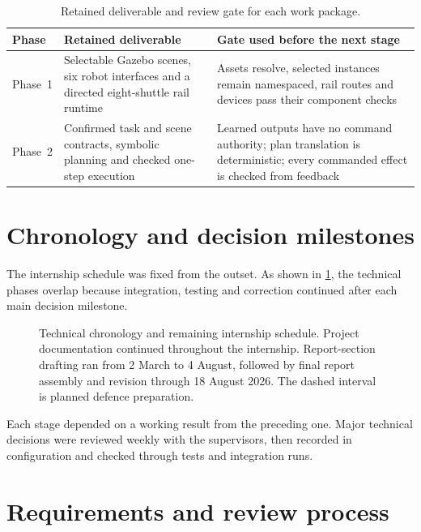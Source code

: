 \begin{table}[htbp]
\centering
\small
\caption{Retained deliverable and review gate for each work package.}
\label{tab:phase-deliverables}
\begin{tabularx}{\textwidth}{@{}
>{\raggedright\arraybackslash}p{}
>{\raggedright\arraybackslash}p{}
>{\raggedright\arraybackslash}X@{}}
\toprule
\textbf{Phase} & \textbf{Retained deliverable} & \textbf{Gate used before the next stage}\\
\midrule
Phase~1 & Selectable Gazebo scenes, six robot interfaces and a directed
eight-shuttle rail runtime & Assets resolve, selected instances remain
namespaced, rail routes and devices pass their component checks\\
\tablerowrule
Phase~2 & Confirmed task and scene contracts, symbolic planning and checked
one-step execution & Learned outputs have no command authority; plan translation
is deterministic; every commanded effect is checked from feedback\\
\bottomrule
\end{tabularx}
\end{table}

\section{Chronology and decision milestones}

The internship schedule was fixed from the outset. As shown in
\cref{fig:timeline}, the technical phases overlap because integration, testing
and correction continued after each main decision milestone.

\begin{figure}[H]
  \centering
  
  \caption[Engineering, reporting and defence-preparation chronology.]
  {Technical chronology and remaining internship schedule. Project
  documentation continued throughout the internship. Report-section drafting
  ran from 2 March to 4 August, followed by final report assembly and revision
  through 18 August 2026. The dashed interval is planned defence preparation.}
  \label{fig:timeline}
\end{figure}
\FloatBarrier

Each stage depended on a working result from the preceding one. Major technical
decisions were reviewed weekly with the supervisors, then recorded in
configuration and checked through tests and integration runs.

\section{Requirements and review process}

